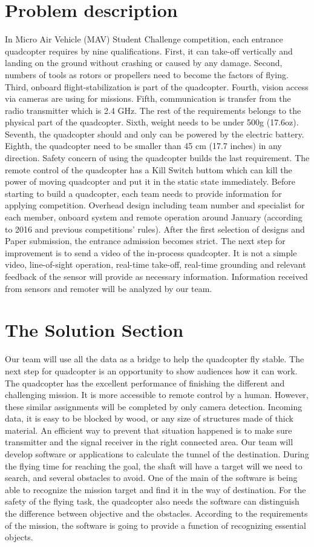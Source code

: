 \documentclass[onecolumn, draftclsnofoot,10pt, compsoc]{IEEEtran}
\begin{document}
\section{Problem description}
In Micro Air Vehicle (MAV) Student Challenge competition, each entrance quadcopter requires by nine qualifications. First, it can take-off vertically and landing on the ground without crashing or caused by any damage. Second, numbers of tools as rotors or propellers need to become the factors of flying. Third, onboard flight-stabilization is part of the quadcopter. Fourth, vision access via cameras are using for missions. Fifth, communication is transfer from the radio transmitter which is 2.4 GHz. The rest of the requirements belongs to the physical part of the quadcopter. Sixth, weight needs to be under 500g (17.6oz). Seventh, the quadcopter should and only can be powered by the electric battery. Eighth, the quadcopter need to be smaller than 45 cm (17.7 inches) in any direction. Safety concern of using the quadcopter builds the last requirement. The remote control of the quadcopter has a Kill Switch buttom which can kill the power of moving quadcopter and put it in the static state immediately.  
Before starting to build a quadcopter, each team needs to provide information for applying competition. Overhead design including team number and specialist for each member, onboard system and remote operation around January (according to 2016 and previous competitions' rules).  
After the first selection of designs and Paper submission, the entrance admission becomes strict. The next step for improvement is to send a video of the in-process quadcopter. It is not a simple video, line-of-sight operation, real-time take-off, real-time grounding and relevant feedback of the sensor will provide as necessary information. Information received from sensors and remoter will be analyzed by our team.  
\section{The Solution Section}
Our team will use all the data as a bridge to help the quadcopter fly stable. The next step for quadcopter is an opportunity to show audiences how it can work. The quadcopter has the excellent performance of finishing the different and challenging mission. It is more accessible to remote control by a human. However, these similar assignments will be completed by only camera detection. Incoming data, it is easy to be blocked by wood, or any size of structures made of thick material.  
An efficient way to prevent that situation happened is to make sure transmitter and the signal receiver in the right connected area. Our team will develop software or applications to calculate the tunnel of the destination. During the flying time for reaching the goal, the shaft will have a target will we need to search, and several obstacles to avoid. One of the main of the software is being able to recognize the mission target and find it in the way of destination. For the safety of the flying task, the quadcopter also needs the software can distinguish the difference between objective and the obstacles. According to the requirements of the mission, the software is going to provide a function of recognizing essential objects.  
\end{document}
